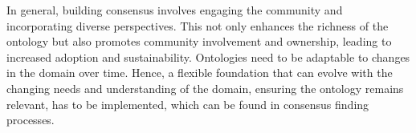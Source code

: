 In general, building consensus involves engaging the community and incorporating diverse perspectives. This not only enhances the richness of the ontology but also promotes community involvement and ownership, leading to increased adoption and sustainability.
Ontologies need to be adaptable to changes in the domain over time. Hence, a flexible foundation that can evolve with the changing needs and understanding of the domain, ensuring the ontology remains relevant, has to be implemented, which can be found in consensus finding processes.
